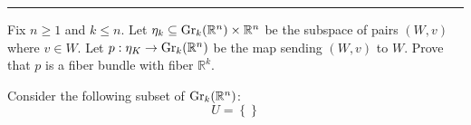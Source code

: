 \documentclass[letterpaper, 12pt]{article}
\begin{document}
\noindent\rule{7in}{2.8pt}
\begin{problem}{3}
Fix \(n\geq 1\) and \(k\leq n\). Let \(\eta_k\subseteq \text{Gr}_k(\mathbb{R}^n)\times \mathbb{R}^n\) be the subspace of pairs \((W,v)\) where \(v\in W\). Let \(p:\eta_K\rightarrow \text{Gr}_k(\mathbb{R}^n)\) be the map sending \((W,v)\) to \(W\). Prove that \(p\) is a fiber bundle with fiber \(\mathbb{R}^k\). 
\end{problem}
\begin{solution}
Consider the following subset of \(\text{Gr}_k(\mathbb{R}^n)\):
\[U=\left\{  \right\}\]
\end{solution}
\end{document}
